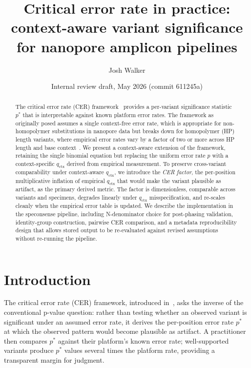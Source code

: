 \documentclass[11pt]{article}
\title{Critical error rate in practice:\\context-aware variant significance for nanopore amplicon pipelines}
\author{Josh Walker}
\date{Internal review draft, May 2026 (commit 611245a)}
\begin{document}
\maketitle
\linenumbers

\begin{abstract}
The critical error rate (CER) framework~\cite{cer_paper} provides a per-variant
significance statistic $p^*$ that is interpretable against known platform error
rates. The framework as originally posed assumes a single context-free error
rate, which is appropriate for non-homopolymer substitutions in nanopore data
but breaks down for homopolymer (HP) length variants, where empirical error
rates vary by a factor of two or more across HP length and base context~\cite{hp_paper}.
We present a context-aware extension of the framework, retaining the single
binomial equation but replacing the uniform error rate $p$ with a
context-specific $q_\text{ctx}$ derived from empirical measurement. To preserve
cross-variant comparability under context-aware $q_\text{ctx}$, we introduce
the \emph{CER factor}, the per-position multiplicative inflation of empirical
$q_\text{ctx}$ that would make the variant plausible as artifact, as the primary
derived metric. The factor is dimensionless, comparable across variants and
specimens, degrades
linearly under $q_\text{ctx}$ misspecification, and re-scales cleanly when the
empirical error table is updated. We describe the implementation in the
speconsense pipeline, including N-denominator choice for post-phasing
validation, identity-group construction, pairwise CER comparison, and a
metadata reproducibility design that allows stored output to be re-evaluated
against revised assumptions without re-running the pipeline.
\end{abstract}

\section{Introduction}

The critical error rate (CER) framework, introduced in~\cite{cer_paper}, asks
the inverse of the conventional p-value question: rather than testing whether
an observed variant is significant under an assumed error rate, it derives the
per-position error rate $p^*$ at which the observed pattern would become
plausible as artifact. A practitioner then compares $p^*$ against their
platform's known error rate; well-supported variants produce $p^*$ values
several times the platform rate, providing a transparent margin for judgment.
\end{document}
